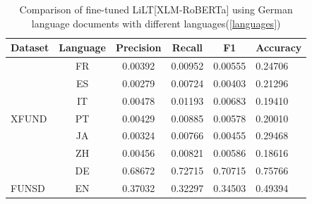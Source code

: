 \begin{table}[!ht]
    \centering
    \captionsetup{justification=centering}
    \begin{tabular}{lccccl}
    \toprule
    \textbf{Dataset}& \textbf{Language} & \textbf{Precision} &\textbf{Recall} & \textbf{F1} & \textbf{Accuracy}\\ \midrule
    \multirow{7}{*}{XFUND} &FR  &0.00392  & 0.00952 &0.00555  &0.24706 \\
                  &  ES&0.00279  &0.00724  &0.00403  &0.21296  \\
                  & IT& 0.00478 & 0.01193 & 0.00683 & 0.19410\\
                  & PT & 0.00429 & 0.00885 & 0.00578 & 0.20010\\
                  & JA & 0.00324 & 0.00766 & 0.00455 & 0.29468 \\
                  & ZH & 0.00456 & 0.00821 & 0.00586 & 0.18616\\
                  &DE & 0.68672& 0.72715&  0.70715& 0.75766 \\  \midrule
                FUNSD  & EN& 0.37032 & 0.32297 & 0.34503 & 0.49394\\ \bottomrule
                  
                                
    \end{tabular}
    \caption{Comparison of fine-tuned LiLT[XLM-RoBERTa] using German language documents with different languages(\cref{languages})}
    \label{tab:Eval_on_different_language}
\end{table}